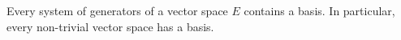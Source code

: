 Every system of generators of a vector space $E$ contains a basis. In particular, every non-trivial vector space has a basis.
